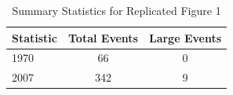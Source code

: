 \begin{table}[h]
\centering
\caption{Summary Statistics for Replicated Figure 1}
\begin{tabular}{lcc}
\hline
Statistic & Total Events & Large Events \\
\hline
1970 & 66 & 0 \\
2007 & 342 & 9 \\
\hline
\end{tabular}
\label{tab:fig1_summary}
\end{table}


